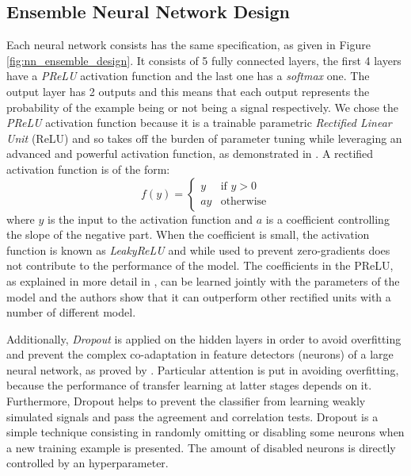 \documentclass[conference]{IEEEtran}
\begin{document}
\subsection{Ensemble Neural Network Design}
\label{sec:NN_design}
Each neural network consists has the same specification, as given in Figure
\ref{fig:nn_ensemble_design}. It consists of 5 fully connected layers, the first
4 layers have a \textit{PReLU} activation function and the last one has a
\textit{softmax} one. The output layer has 2 outputs and this means that each
output represents the probability of the example being or not being a signal
respectively. We chose the \textit{PReLU} activation function because it is a
trainable parametric \textit{Rectified Linear Unit} (ReLU)  and so takes off the
burden of parameter tuning while leveraging an advanced and powerful activation
function, as demonstrated in \cite{he2015delving}. A rectified activation
function is of the form:
\begin{equation}
	f(y) = \begin{cases} y & \text{if } y > 0 \\ ay & \text{otherwise} \end{cases}
	\label{eq:relu}
\end{equation}
where $y$ is the input to the activation function and $a$ is a coefficient
controlling the slope of the negative part. When the coefficient is small, the
activation function is known as \textit{LeakyReLU} and while used to prevent
zero-gradients does not contribute to the performance of the model. The
coefficients in the PReLU, as explained in more detail in \cite{he2015delving},
can be learned jointly with the parameters of the model and the authors show
that it can outperform other rectified units with a number of different model.

Additionally, \textit{Dropout} is applied on the hidden layers in order to avoid
overfitting and prevent the complex co-adaptation in feature detectors (neurons) of a large neural network, as proved by \cite{srivastava2014dropout, hinton2012improving}. Particular attention is put in avoiding overfitting, because the performance of transfer learning at latter stages depends on it. Furthermore, Dropout helps to prevent the classifier from learning weakly simulated signals and pass the agreement and correlation
tests. Dropout is a simple technique consisting in randomly omitting or
disabling some neurons when a new training example is presented. The amount of
disabled neurons is directly controlled by an hyperparameter.
\end{document}
